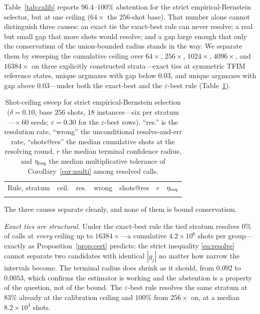 \documentclass[aps,pra,reprint,superscriptaddress,nofootinbib,floatfix]{revtex4-2}
\begin{document}
Table~\ref{tab:calib} reports $96.4$--$100\%$ abstention for the strict empirical-Bernstein selector, but at one ceiling ($64\times$ the $256$-shot base). That number alone cannot distinguish three causes: an exact tie the exact-best rule can never resolve; a real but small gap that more shots would resolve; and a gap large enough that only the conservatism of the union-bounded radius stands in the way. We separate them by sweeping the cumulative ceiling over $64\times$, $256\times$, $1024\times$, $4096\times$, and $16384\times$ on three explicitly constructed strata---exact ties at symmetric TFIM reference states, unique argmaxes with gap below $0.03$, and unique argmaxes with gap above $0.03$---under both the exact-best and the $\varepsilon$-best rule (Table~\ref{tab:ceiling}).

\begin{table}[t]
\caption{Shot-ceiling sweep for strict empirical-Bernstein selection ($\delta=0.10$, base $256$ shots, $18$ instances---six per stratum---$\times\,60$ seeds; $\varepsilon=0.30$ for the $\varepsilon$-best rows). ``res.'' is the resolution rate, ``wrong'' the unconditional resolve-and-err rate, ``shots@res'' the median cumulative shots at the resolving round, $r$ the median terminal confidence radius, and $\eta_{\rm req}$ the median multiplicative tolerance of Corollary~\ref{cor:multi} among resolved calls.}
\label{tab:ceiling}
\centering
\footnotesize
\begin{ruledtabular}
\begin{tabular}{llrrrrr}
Rule, stratum & ceil. & res. & wrong & shots@res & $r$ & $\eta_{\rm req}$\\
\colrule

\end{tabular}
\end{ruledtabular}
\end{table}

The three causes separate cleanly, and none of them is bound conservatism.

\emph{Exact ties are structural.} Under the exact-best rule the tied stratum resolves $0\%$ of calls at \emph{every} ceiling up to $16384\times$---a cumulative $4.2\times10^{6}$ shots per group---exactly as Proposition~\ref{prop:cert} predicts: the strict inequality \eqref{eq:resolve} cannot separate two candidates with identical $|g_j|$ no matter how narrow the intervals become. The terminal radius does shrink as it should, from $0.092$ to $0.0053$, which confirms the estimator is working and the abstention is a property of the question, not of the bound. The $\varepsilon$-best rule resolves the same stratum at $83\%$ already at the calibration ceiling and $100\%$ from $256\times$ on, at a median $8.2\times10^4$ shots.
\end{document}
